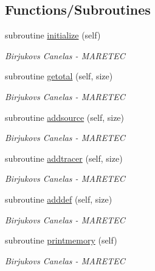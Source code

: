 \subsection*{Functions/\+Subroutines}
\begin{DoxyCompactItemize}
\item 
subroutine \mbox{\hyperlink{namespacesimulation__memory_a3b8f4e0766c90e6d6bd99e2fa49ea91b}{initialize}} (self)
\begin{DoxyCompactList}\small\item\em Birjukovs Canelas -\/ M\+A\+R\+E\+T\+EC \end{DoxyCompactList}\item 
subroutine \mbox{\hyperlink{namespacesimulation__memory_a8589522c4e28cf60741a5439477cdb31}{getotal}} (self, size)
\begin{DoxyCompactList}\small\item\em Birjukovs Canelas -\/ M\+A\+R\+E\+T\+EC \end{DoxyCompactList}\item 
subroutine \mbox{\hyperlink{namespacesimulation__memory_acf01ce7bcb2d7571d37fb2c0338e5bd2}{addsource}} (self, size)
\begin{DoxyCompactList}\small\item\em Birjukovs Canelas -\/ M\+A\+R\+E\+T\+EC \end{DoxyCompactList}\item 
subroutine \mbox{\hyperlink{namespacesimulation__memory_a4d6c8bd027a99cb6c7f9ad2eb55c744f}{addtracer}} (self, size)
\begin{DoxyCompactList}\small\item\em Birjukovs Canelas -\/ M\+A\+R\+E\+T\+EC \end{DoxyCompactList}\item 
subroutine \mbox{\hyperlink{namespacesimulation__memory_a62d5641dbec45bc279575c173b0f0f24}{adddef}} (self, size)
\begin{DoxyCompactList}\small\item\em Birjukovs Canelas -\/ M\+A\+R\+E\+T\+EC \end{DoxyCompactList}\item 
subroutine \mbox{\hyperlink{namespacesimulation__memory_a5827bef8479b809a453af147ceaa8c7c}{printmemory}} (self)
\begin{DoxyCompactList}\small\item\em Birjukovs Canelas -\/ M\+A\+R\+E\+T\+EC \end{DoxyCompactList}\end{DoxyCompactItemize}
